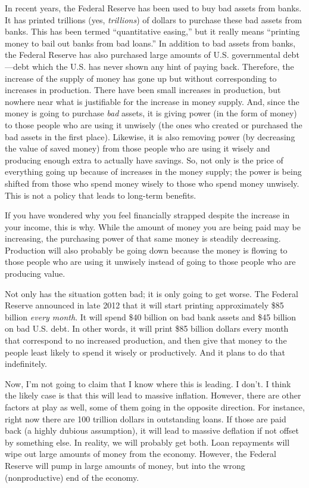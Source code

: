 In recent years, the Federal Reserve has been used to buy bad assets
from banks. It has printed trillions (yes, \textit{trillions}) of
dollars to purchase these bad assets from banks. This has been termed
“quantitative easing,” but it really means “printing money to bail out
banks from bad loans.”  In addition to bad assets from banks, the
Federal Reserve has also purchased large amounts of U.S. governmental
debt—debt which the U.S. has never shown any hint of paying back.
Therefore, the increase of the supply of money has gone up but without
corresponding to increases in production. There have been small
increases in production, but nowhere near what is justifiable for the
increase in money supply. And, since the money is going to purchase
\textit{bad} assets, it is giving power (in the form of money) to those
people who are using it unwisely (the ones who created or purchased the
bad assets in the first place).  Likewise, it is also removing power
(by decreasing the value of saved money) from those people who are
using it wisely and
producing enough extra to actually have
savings.  So, not
only is the price of everything going up because of increases in the
money supply; the power is being shifted from those who spend money
wisely to those who spend money unwisely. This is not a policy that
leads to long-term benefits.


If you have wondered why you feel financially strapped despite the
increase in your income, this is why. While the amount of money you are
being paid may be increasing, the purchasing power of that same money
is steadily decreasing. Production will also probably be going down
because the money is flowing to those people who are using it unwisely
instead of going to those people who are producing value.


Not only has the situation gotten bad; it is only going to get worse.
The Federal Reserve announced in late 2012 that it will start printing
approximately \$85 billion \textit{every month}. It will spend \$40
billion on bad bank assets and \$45 billion on bad U.S. debt. In other
words, it will print \$85 billion dollars every month that correspond
to no increased production, and then give that money to the people
least likely to spend it wisely or productively. And it plans to do
that indefinitely.


Now, I’m not going to claim that I know where this is leading. I don’t.
I think the likely case is that this will lead to massive inflation. 
However, there are other factors at play as well, some of them going in
the opposite direction.  For instance, right now there are 100 trillion
dollars in outstanding loans. If those are paid back (a highly dubious
assumption), it will lead to massive deflation if not offset by
something else.  In reality, we will probably get both. Loan repayments
will wipe out large amounts of money from the economy.  However, the
Federal Reserve will pump in large amounts of money, but into the wrong
(nonproductive) end of the economy.  


